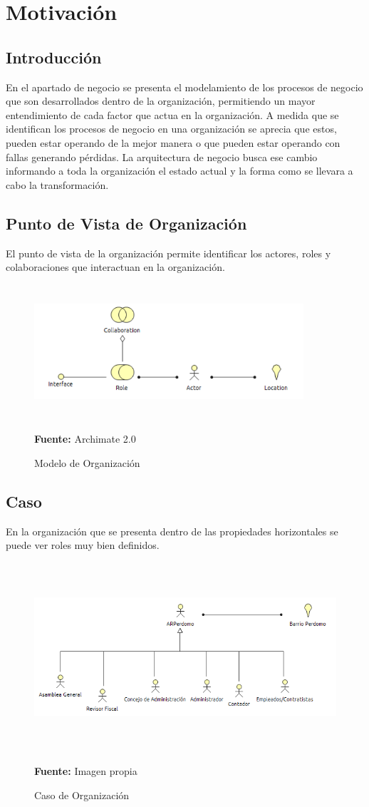 \section{Motivación}
\subsection{Introducción}

En el apartado de negocio se presenta el modelamiento de los procesos de negocio que son desarrollados dentro de la organización, permitiendo un mayor entendimiento de cada factor que actua en la organización. A medida que se identifican los procesos de negocio en una organización se aprecia que estos, pueden estar operando de la mejor manera o que pueden estar operando con fallas generando pérdidas. La arquitectura de negocio busca ese cambio informando a toda la organización el estado actual y la forma como se llevara a cabo la transformación.


\newpage

\subsection{Punto de Vista de Organización}

El punto de vista de la organización permite identificar los actores, roles y colaboraciones que interactuan en la organización.


\begin{figure}[th!]
	\centering
	\includegraphics[width=10cm,height=5cm]{arquitectura/negocio/imgs/m_organizacion}
	\caption{Modelo de Organización}{\scriptsize \textbf{Fuente:} Archimate 2.0}
\end{figure}

\subsection{Caso}

En la organización que se presenta dentro de las propiedades horizontales se puede ver roles muy bien definidos.

\begin{figure}[th!]
	\centering
	\includegraphics[width=12cm,height=7cm]{arquitectura/negocio/imgs/organizacion}
	\caption{Caso de Organización}{\scriptsize \textbf{Fuente:} Imagen propia}
\end{figure}
\newpage